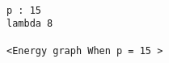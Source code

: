 \documentclass[11pt]{article}
\begin{document}
    \begin{center}
    \end{center}
    { \hspace*{\fill} \\}
    
    \begin{Verbatim}[commandchars=\\\{\}]
p : 15
lambda 8

<Energy graph When p = 15 >

    \end{Verbatim}

    \begin{center}
    \end{center}
    { \hspace*{\fill} \\}
    

    
    
    
    
\end{document}
